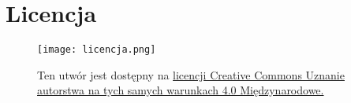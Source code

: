 \section*{Licencja}
\begin{figure}[h]
	\begin{minipage}[c]{0.25\textwidth}
		\texttt{[image: licencja.png]}
	\end{minipage}\hfill
	\begin{minipage}[c]{0.75\textwidth}
		\caption*{
			Ten utwór jest dostępny na
			\href{https://creativecommons.org/licenses/by-sa/4.0/}{licencji Creative Commons Uznanie autorstwa
				na tych samych warunkach 4.0 Międzynarodowe.}
		}
	\end{minipage}
\end{figure}
